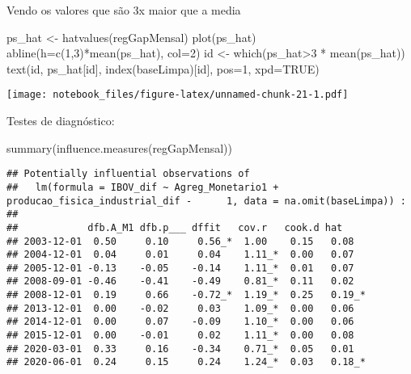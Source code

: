 \documentclass[
]{article}
\newenvironment{Shaded}{\begin{snugshade}}{\end{snugshade}}
\newcommand{\AttributeTok}[1]{\textcolor[rgb]{0.77,0.63,0.00}{#1}}
\newcommand{\ConstantTok}[1]{\textcolor[rgb]{0.00,0.00,0.00}{#1}}
\newcommand{\DecValTok}[1]{\textcolor[rgb]{0.00,0.00,0.81}{#1}}
\newcommand{\FunctionTok}[1]{\textcolor[rgb]{0.00,0.00,0.00}{#1}}
\newcommand{\NormalTok}[1]{#1}
\newcommand{\OtherTok}[1]{\textcolor[rgb]{0.56,0.35,0.01}{#1}}
\newcommand{\SpecialCharTok}[1]{\textcolor[rgb]{0.00,0.00,0.00}{#1}}
\begin{document}
Vendo os valores que são 3x maior que a media

\begin{Shaded}
\begin{Highlighting}[]
\NormalTok{ps\_hat }\OtherTok{\textless{}{-}} \FunctionTok{hatvalues}\NormalTok{(regGapMensal)}
\FunctionTok{plot}\NormalTok{(ps\_hat)}
\FunctionTok{abline}\NormalTok{(}\AttributeTok{h=}\FunctionTok{c}\NormalTok{(}\DecValTok{1}\NormalTok{,}\DecValTok{3}\NormalTok{)}\SpecialCharTok{*}\FunctionTok{mean}\NormalTok{(ps\_hat), }\AttributeTok{col=}\DecValTok{2}\NormalTok{)}
\NormalTok{id }\OtherTok{\textless{}{-}} \FunctionTok{which}\NormalTok{(ps\_hat}\SpecialCharTok{\textgreater{}}\DecValTok{3} \SpecialCharTok{*} \FunctionTok{mean}\NormalTok{(ps\_hat))}
\FunctionTok{text}\NormalTok{(id, ps\_hat[id], }\FunctionTok{index}\NormalTok{(baseLimpa)[id], }\AttributeTok{pos=}\DecValTok{1}\NormalTok{, }\AttributeTok{xpd=}\ConstantTok{TRUE}\NormalTok{)}
\end{Highlighting}
\end{Shaded}

\texttt{[image: notebook\_files/figure-latex/unnamed-chunk-21-1.pdf]}

Testes de diagnóstico:

\begin{Shaded}
\begin{Highlighting}[]
\FunctionTok{summary}\NormalTok{(}\FunctionTok{influence.measures}\NormalTok{(regGapMensal))}
\end{Highlighting}
\end{Shaded}

\begin{verbatim}
## Potentially influential observations of
##   lm(formula = IBOV_dif ~ Agreg_Monetario1 + producao_fisica_industrial_dif -      1, data = na.omit(baseLimpa)) :
## 
##            dfb.A_M1 dfb.p___ dffit   cov.r   cook.d hat    
## 2003-12-01  0.50     0.10     0.56_*  1.00    0.15   0.08  
## 2004-12-01  0.04     0.01     0.04    1.11_*  0.00   0.07  
## 2005-12-01 -0.13    -0.05    -0.14    1.11_*  0.01   0.07  
## 2008-09-01 -0.46    -0.41    -0.49    0.81_*  0.11   0.02  
## 2008-12-01  0.19     0.66    -0.72_*  1.19_*  0.25   0.19_*
## 2013-12-01  0.00    -0.02     0.03    1.09_*  0.00   0.06  
## 2014-12-01  0.00     0.07    -0.09    1.10_*  0.00   0.06  
## 2015-12-01  0.00    -0.01     0.02    1.11_*  0.00   0.08  
## 2020-03-01  0.33     0.16    -0.34    0.71_*  0.05   0.01  
## 2020-06-01  0.24     0.15     0.24    1.24_*  0.03   0.18_*
\end{verbatim}
\end{document}
